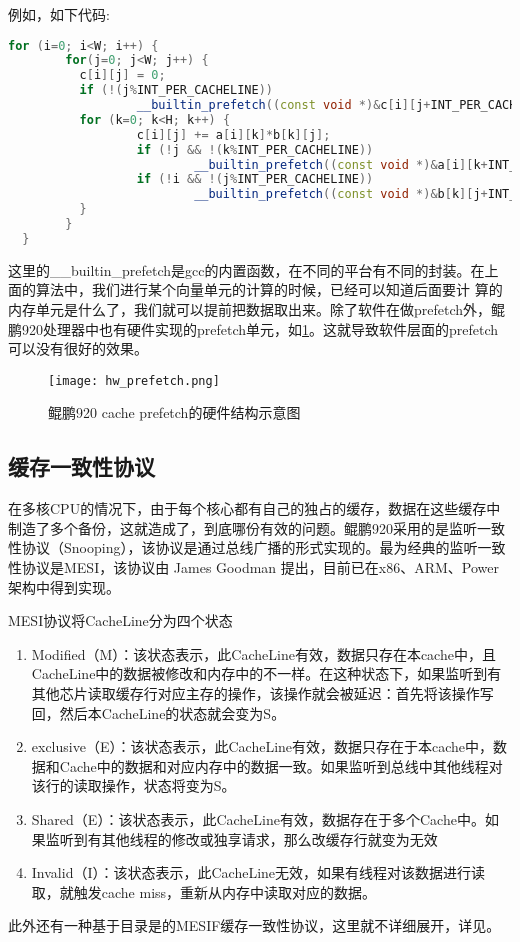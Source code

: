 例如，如下代码:
\begin{lstlisting}[language=c++]
    for (i=0; i<W; i++) {
        for(j=0; j<W; j++) {
          c[i][j] = 0;
          if (!(j%INT_PER_CACHELINE))
                  __builtin_prefetch((const void *)&c[i][j+INT_PER_CACHELINE], 1, 3);
          for (k=0; k<H; k++) {
                  c[i][j] += a[i][k]*b[k][j];
                  if (!j && !(k%INT_PER_CACHELINE))
                          __builtin_prefetch((const void *)&a[i][k+INT_PER_CACHELINE], 0, 3);
                  if (!i && !(j%INT_PER_CACHELINE))
                          __builtin_prefetch((const void *)&b[k][j+INT_PER_CACHELINE], 0, 3);
          }
        }
  }
\end{lstlisting}
这里的\_\_builtin\_prefetch是gcc的内置函数，在不同的平台有不同的封装。在上面的算法中，我们进行某个向量单元的计算的时候，已经可以知道后面要计 算的内存单元是什么了，我们就可以提前把数据取出来。除了软件在做prefetch外，鲲鹏920处理器中也有硬件实现的prefetch单元，如\ref{hw_prefetch}。这就导致软件层面的prefetch可以没有很好的效果。

\begin{figure}[htbp]
    \centering
    \texttt{[image: hw\_prefetch.png]}
    \caption{鲲鹏920 cache prefetch的硬件结构示意图}
    \label{hw_prefetch}
\end{figure}

\subsection{缓存一致性协议}

在多核CPU的情况下，由于每个核心都有自己的独占的缓存，数据在这些缓存中制造了多个备份，这就造成了，到底哪份有效的问题。鲲鹏920采用的是监听一致性协议（Snooping），该协议是通过总线广播的形式实现的。最为经典的监听一致性协议是MESI，该协议由 James Goodman 提出，目前已在x86、ARM、Power架构中得到实现。

MESI协议将CacheLine分为四个状态
\begin{enumerate} \setlength{\itemsep}{0pt}
\item Modified（M）：该状态表示，此CacheLine有效，数据只存在本cache中，且CacheLine中的数据被修改和内存中的不一样。在这种状态下，如果监听到有其他芯片读取缓存行对应主存的操作，该操作就会被延迟：首先将该操作写回，然后本CacheLine的状态就会变为S。
\item exclusive（E）：该状态表示，此CacheLine有效，数据只存在于本cache中，数据和Cache中的数据和对应内存中的数据一致。如果监听到总线中其他线程对该行的读取操作，状态将变为S。
\item Shared（E）：该状态表示，此CacheLine有效，数据存在于多个Cache中。如果监听到有其他线程的修改或独享请求，那么改缓存行就变为无效
\item Invalid（I）：该状态表示，此CacheLine无效，如果有线程对该数据进行读取，就触发cache miss，重新从内存中读取对应的数据。

\end{enumerate}
此外还有一种基于目录是的MESIF缓存一致性协议，这里就不详细展开，详见\cite{husengseng2017}。

